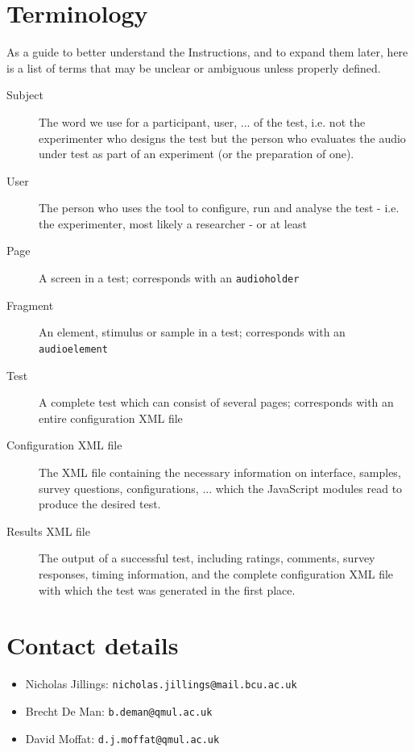 \documentclass[11pt, oneside]{article}   	%
\begin{document}
\section{Terminology} %
	As a guide to better understand the Instructions, and to expand them later, here is a list of terms that may be unclear or ambiguous unless properly defined. 
	\begin{description}
		\item[Subject] The word we use for a participant, user, ... of the test, i.e. not the experimenter who designs the test but the person who evaluates the audio under test as part of an experiment (or the preparation of one). 
		\item[User] The person who uses the tool to configure, run and analyse the test - i.e. the experimenter, most likely a researcher - or at least 
		\item[Page] A screen in a test; corresponds with an \texttt{audioholder}
		\item[Fragment] An element, stimulus or sample in a test; corresponds with an \texttt{audioelement}
		\item[Test] A complete test which can consist of several pages; corresponds with an entire configuration XML file
		\item[Configuration XML file] The XML file containing the necessary information on interface, samples, survey questions, configurations, ... which the JavaScript modules read to produce the desired test.
		\item[Results XML file] The output of a successful test, including ratings, comments, survey responses, timing information, and the complete configuration XML file with which the test was generated in the first place. 
	\end{description}

\clearpage

\setcounter{secnumdepth}{0} %
\section{Contact details} %
\label{sec:contact}

	\begin{itemize}
		\item Nicholas Jillings: \texttt{nicholas.jillings@mail.bcu.ac.uk}
		\item Brecht De Man: \texttt{b.deman@qmul.ac.uk}
		\item David Moffat: \texttt{d.j.moffat@qmul.ac.uk}
	\end{itemize}
\end{document}
